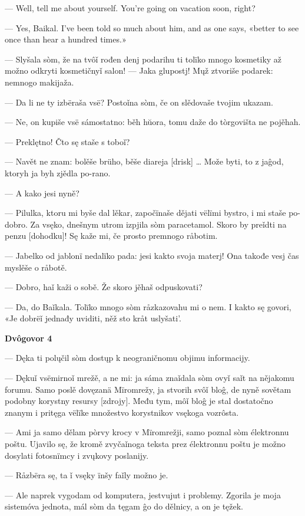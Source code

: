 — Well, tell me about yourself. You’re going on vacation soon, right?

— Yes, Baikal. I’ve been told so much about him, and as one says, «better to see once than hear a hundred times.»


— Slyšala sòm, že na tvôǐ rođen denj podarihu ti tolïko mnogo kosmetiky až možno odkryti kosmetičnyǐ salon!
— Jaka glupostj! Mųž ztvoriše podarek: nemnogo makijaža.

— Da li ne ty izbëraša vsë? Postoǐna sòm, če on slědovaše tvojim ukazam.

— Ne, on kupiše vsë sámostatno: běh hŭora, tomu daže do tòrgovišta ne pojěhah.

— Preklętno! Čto sę staše s toboǐ?

— Navět ne znam: bolěše brüho, běše diareja [drisk] … Može byti, to z jaĝod, ktoryh ja byh zjědla po-rano.

— A kako jesi nyně?

— Pilulka, ktoru mi byše dal lěkar, započïnaše dějati vëlïmi bystro, i mi staše po-dobro. Za vsęko, dnešnym utrom izpjila sòm paracetamol. Skoro by preǐdti na penzu [dohodku]! Sę kaže mi, če prosto premnogo råbotim.

— Jabelko od jablonï nedalïko pada: jesi kakto svoja materj! Ona takođe vesj čas myslěše o råbotě.

— Dobro, haǐ kaži o sobě. Že skoro jěhaš odpuskovati?

— Da, do Baǐkala. Tolïko mnogo sòm råzkazovahu mi o nem. I kakto sę govori, «Je dobrëǐ jednađy uviditi, něž sto kråt uslyšati’.


\textbf{Dvôgovor 4}


— Dęka ti polųčil sòm dostųp k neograničnomu objimu informacijy.

— Dękuǐ vsëmirnoǐ mrežě, a ne mi: ja sáma znaǐdala sòm ovyǐ saǐt na nějakomu forumu. Samo poslě dovęzanä Mïromrežy, ja stvorih svôǐ bloĝ, de nyně sovětam podobny korystny resursy [zdrojy]. Među tym, môǐ bloĝ je stal dostatočno znanym i pritęga vëlïke množestvo korystnikov vsękoga vozrôsta.

— Ami ja samo dělam pòrvy krocy v Mïromrežji, samo poznal sòm élektronnu poštu. Ujavilo sę, že kromě zvyčaǐnoga teksta prez élektronnu poštu je možno dosylati fotosnïmcy i zvųkovy poslanijy.

— Råzbëra sę, ta ǐ vsęky ïnšy faǐly možno je.

— Ale naprek vygodam od komputera, jestvujut i problemy. Zgorila je moja sistemóva jednota, mál sòm da tęgam ĝo do dělnicy, a on je tęžek.

